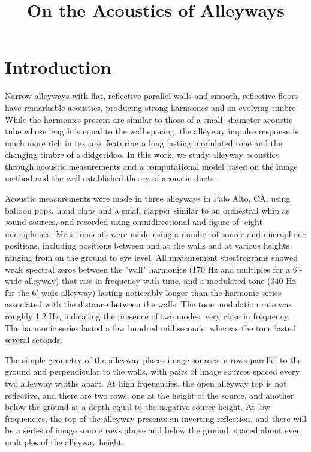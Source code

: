 \documentclass{aes137}
\affiliation[1]{BigCity College, City, ST, 00000, Country}
\affiliation[2]{Smallville State Technical Institute, Smallville, XR,
99999, Country}
\title{On the Acoustics of Alleyways}
\begin{document}
\maketitle %


\section{Introduction}
Narrow alleyways with flat, reflective parallel walls and smooth, reflective floors have remarkable acoustics, producing strong harmonics and an evolving timbre. While the harmonics present are similar to those of a small- diameter acoustic tube whose length is equal to the wall spacing, the alleyway impulse response is much more rich in texture, featuring a long lasting modulated tone and the changing timbre of a didgeridoo. In this work, we study alleyway acoustics through acoustic measurements and a computational model based on the image method \cite{Borish} and the well established theory of acoustic ducts \cite{Morse}.

Acoustic measurements were made in three alleyways in Palo Alto, CA, using balloon pops, hand claps and a small clapper similar to an orchestral whip as sound sources, and recorded using omnidirectional and figure-of- eight microphones. Measurements were made using a number of source and microphone positions, including positions between and at the walls and at various heights ranging from on the ground to eye level. All measurement spectrograms showed weak spectral zeros between the "wall" harmonics (170 Hz and multiples for a 6'-wide alleyway) that rise in frequency with time, and a modulated tone (340 Hz for the 6'-wide alleyway) lasting noticeably longer than the harmonic series associated with the distance between the walls. The tone modulation rate was roughly 1.2 Hz, indicating the presence of two modes, very close in frequency. The harmonic series lasted a few hundred milliseconds, whereas the tone lasted several seconds.

The simple geometry of the alleyway places image sources in rows parallel to the ground and perpendicular to the walls, with pairs of image sources spaced every two alleyway widths apart. At high frqeuencies, the open alleyway top is not reflective, and there are two rows, one at the height of the source, and another below the ground at a depth equal to the negative source height. At low frequencies, the top of the alleyway presents an inverting reflection, and there will be a series of image source rows above and below the ground, spaced about even multiples of the alleyway height.
\end{document}
